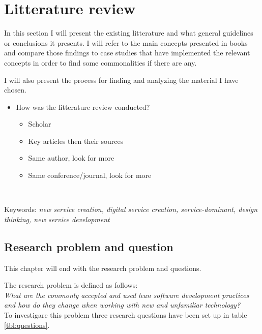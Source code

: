 
\chapter{Litterature review}
\label{chapter:litterature}

In this section I will present the existing litterature and what general guidelines or conclusions it presents. I will refer to the main concepts presented in books and compare those findings to case studies that have implemented the relevant concepts in order to find some commonalities if there are any.

I will also present the process for finding and analyzing the material I have chosen.

\begin{itemize}
  \item{How was the litterature review conducted?}
  \begin{itemize}
    \item{Scholar}
    \item{Key articles then their sources}
    \item{Same author, look for more}
    \item{Same conference/journal, look for more}
  \end{itemize}
  \
\end{itemize}

Keywords: \textit{new service creation, digital service creation, service-dominant, design thinking, new service development}


\section{Research problem and question}
\label{section:problem}

This chapter will end with the research problem and questions.

The research problem is defined as follows:\\

\textit{What are the commonly accepted and used lean software development practices and how do they change when working with new and unfamiliar technology?}\\

To investigare this problem three research questions have been set up in table \ref{tbl:questions}.


